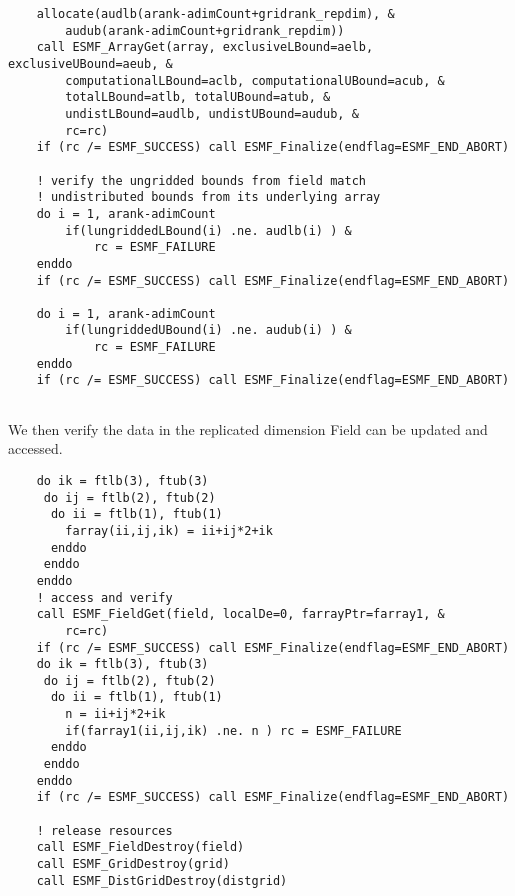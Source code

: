  \begin{verbatim}
    allocate(audlb(arank-adimCount+gridrank_repdim), &
        audub(arank-adimCount+gridrank_repdim))
    call ESMF_ArrayGet(array, exclusiveLBound=aelb, exclusiveUBound=aeub, &
        computationalLBound=aclb, computationalUBound=acub, &
        totalLBound=atlb, totalUBound=atub, &
        undistLBound=audlb, undistUBound=audub, &
        rc=rc)
    if (rc /= ESMF_SUCCESS) call ESMF_Finalize(endflag=ESMF_END_ABORT)

    ! verify the ungridded bounds from field match
    ! undistributed bounds from its underlying array
    do i = 1, arank-adimCount
        if(lungriddedLBound(i) .ne. audlb(i) ) &
            rc = ESMF_FAILURE
    enddo
    if (rc /= ESMF_SUCCESS) call ESMF_Finalize(endflag=ESMF_END_ABORT)

    do i = 1, arank-adimCount
        if(lungriddedUBound(i) .ne. audub(i) ) &
            rc = ESMF_FAILURE
    enddo
    if (rc /= ESMF_SUCCESS) call ESMF_Finalize(endflag=ESMF_END_ABORT)
 
\end{verbatim}
 

   We then verify the data in the replicated dimension Field can be updated and accessed. 

 \begin{verbatim}
    do ik = ftlb(3), ftub(3)
     do ij = ftlb(2), ftub(2)
      do ii = ftlb(1), ftub(1)
        farray(ii,ij,ik) = ii+ij*2+ik
      enddo
     enddo
    enddo
    ! access and verify
    call ESMF_FieldGet(field, localDe=0, farrayPtr=farray1, &
        rc=rc)
    if (rc /= ESMF_SUCCESS) call ESMF_Finalize(endflag=ESMF_END_ABORT)
    do ik = ftlb(3), ftub(3)
     do ij = ftlb(2), ftub(2)
      do ii = ftlb(1), ftub(1)
        n = ii+ij*2+ik
        if(farray1(ii,ij,ik) .ne. n ) rc = ESMF_FAILURE
      enddo
     enddo
    enddo
    if (rc /= ESMF_SUCCESS) call ESMF_Finalize(endflag=ESMF_END_ABORT)

    ! release resources
    call ESMF_FieldDestroy(field)
    call ESMF_GridDestroy(grid)
    call ESMF_DistGridDestroy(distgrid)
 
\end{verbatim}

\setlength{\parskip}{\oldparskip}
\setlength{\parindent}{\oldparindent}
\setlength{\baselineskip}{\oldbaselineskip}

